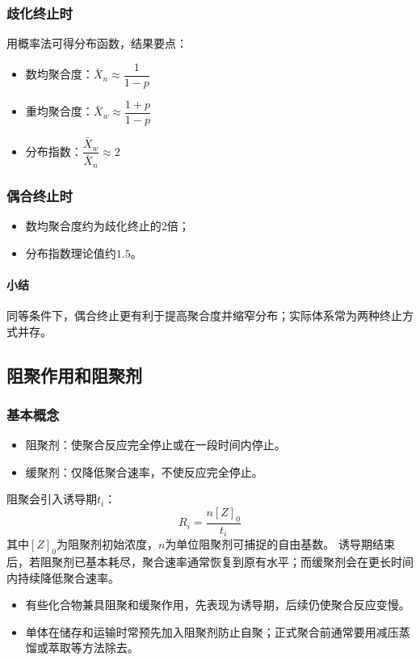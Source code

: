 ﻿\documentclass[12pt,a4paper]{article}
\begin{document}
\subsubsection{歧化终止时}
用概率法可得分布函数，结果要点：
\begin{itemize}
  \item 数均聚合度：$\bar{X}_n\approx\dfrac{1}{1-p}$
  \item 重均聚合度：$\bar{X}_w\approx\dfrac{1+p}{1-p}$
  \item 分布指数：$\dfrac{\bar{X}_w}{\bar{X}_n}\approx2$
\end{itemize}

\subsubsection{偶合终止时}
\begin{itemize}
  \item 数均聚合度约为歧化终止的2倍；
  \item 分布指数理论值约$1.5$。
\end{itemize}

\paragraph{小结}
同等条件下，偶合终止更有利于提高聚合度并缩窄分布；实际体系常为两种终止方式并存。

\subsection{阻聚作用和阻聚剂}
\subsubsection{基本概念}
\begin{itemize}
  \item 阻聚剂：使聚合反应完全停止或在一段时间内停止。
  \item 缓聚剂：仅降低聚合速率，不使反应完全停止。
\end{itemize}
阻聚会引入诱导期$t_i$：
\[
R_i=\frac{n[Z]_0}{t_i}
\]
其中$[Z]_0$为阻聚剂初始浓度，$n$为单位阻聚剂可捕捉的自由基数。
诱导期结束后，若阻聚剂已基本耗尽，聚合速率通常恢复到原有水平；而缓聚剂会在更长时间内持续降低聚合速率。
\begin{itemize}
  \item 有些化合物兼具阻聚和缓聚作用，先表现为诱导期，后续仍使聚合反应变慢。
  \item 单体在储存和运输时常预先加入阻聚剂防止自聚；正式聚合前通常要用减压蒸馏或萃取等方法除去。
\end{itemize}
\end{document}
